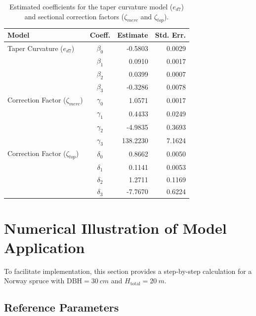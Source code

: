 \documentclass[twocolumn, bibliography=totoc]{scrartcl}
\begin{document}
\begin{table}[htbp]
\centering
\caption{Estimated coefficients for the taper curvature model ($e_{d7}$) and sectional correction factors ($\zeta_{merc}$ and $\zeta_{top}$).}
\label{tab:coefficients_extended}
\begin{tabular}{l c r r}
\toprule
Model & Coeff. & Estimate & Std. Err. \\
\midrule
Taper Curvature ($e_{d7}$) & $\beta_0$ & -0.5803 & 0.0029 \\
                           & $\beta_1$ & 0.0910  & 0.0017 \\
                           & $\beta_2$ & 0.0399  & 0.0007 \\
                           & $\beta_3$ & -0.3286 & 0.0078 \\
\midrule
Correction Factor ($\zeta_{merc}$) & $\gamma_0$ & 1.0571   & 0.0017 \\
                                   & $\gamma_1$ & 0.4433   & 0.0249 \\
                                   & $\gamma_2$ & -4.9835  & 0.3693 \\
                                   & $\gamma_3$ & 138.2230 & 7.1624 \\
\midrule
Correction Factor ($\zeta_{top}$) & $\delta_0$ & 0.8662  & 0.0050 \\
                                  & $\delta_1$ & 0.1141  & 0.0053 \\
                                  & $\delta_2$ & 1.2711  & 0.1169 \\
                                  & $\delta_3$ & -7.7670 & 0.6224 \\
\bottomrule
\end{tabular}
\end{table}


\section{Numerical Illustration of Model Application}

To facilitate implementation, this section provides a step-by-step calculation for a Norway spruce with $\text{DBH} = \qty{30}{cm}$ and $H_{\text{total}} = \qty{20}{m}$.

\subsection{Reference Parameters}
\end{document}
